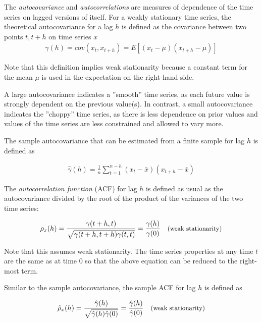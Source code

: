 The \emph{autocovariance} and \emph{autocorrelations} are measures of dependence of the time series on lagged versions of itself. For a weakly stationary time series, the theoretical autocovariance for a lag $h$ is defined as the covariance between two points $t, t+h$ on time series $x$
\begin{align*}
\gamma(h) = cov(x_t, x_{t+h}) = E [ (x_t - \mu)(x_{t+h} - \mu)] 
\end{align*}

Note that this definition implies weak stationarity because a constant term for the mean $\mu$ is used in the expectation on the right-hand side.

A large autocovariance indicates a ''smooth'' time series, as each future value is strongly dependent on the previous value(s). In contrast, a small autocovariance indicates the ''choppy'' time series, as there is less dependence on prior values and values of the time series are less constrained and allowed to vary more. 

The sample autocovariance that can be estimated from a finite sample for lag $h$ is defined as  

\begin{align*}
\hat{\gamma}(h)  = \frac{1}{n} \sum_{t=1}^{n-h} (x_t - \bar{x})(x_{t+h} - \bar{x})
\end{align*}

The \emph{autocorrelation function} (ACF) for lag $h$ is defined as usual as the autocovariance divided by the root of the product of the variances of the two time series:

\begin{align*}
\rho_x(h) = \frac{\gamma (t+h,t)}{\sqrt{\gamma (t+h,t+h) \gamma(t, t)}} = \frac{\gamma(h)}{\gamma(0)}  \quad \text{\small (weak stationarity)}
\end{align*}

Note that this assumes weak stationarity. The time series properties at any time $t$ are the same as at time $0$ so that the above equation can be reduced to the right-most term.

Similar to the sample autocovariance, the sample ACF for lag $h$ is defined as

\begin{align*}
\hat\rho_x(h) = \frac{\hat\gamma(h)}{\sqrt{\hat\gamma(h) \hat\gamma(0)}} = \frac{\hat\gamma(h)}{\hat\gamma(0)} \quad \text{\small (weak stationarity)}
\end{align*}

